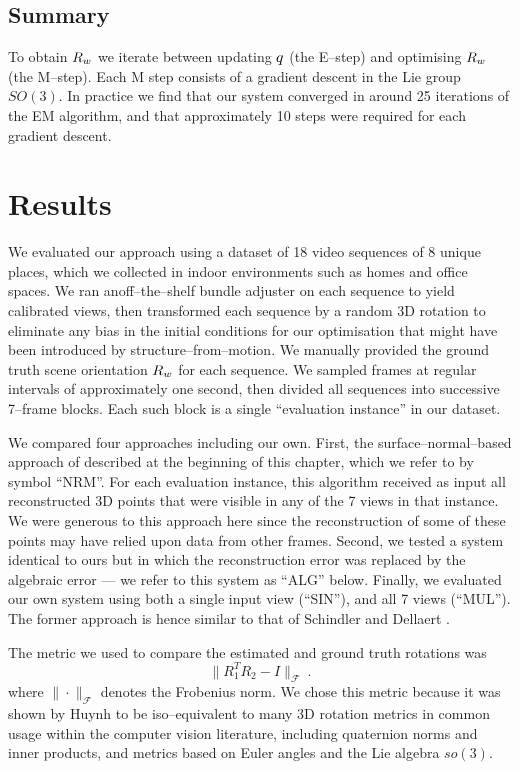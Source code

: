 \subsection{Summary}
To obtain $\SceneR$ we iterate between updating $\PosteriorEst$ (the
E--step) and optimising $\SceneR$ (the M--step). Each M step consists
of a gradient descent in the Lie group $SO(3)$. In practice we find
that our system converged in around 25 iterations of the EM algorithm,
and that approximately 10 steps were required for each gradient
descent.

\section{Results}

We evaluated our approach using a dataset of 18 video sequences of 8
unique places, which we collected in indoor environments such as homes
and office spaces. We ran an\changedsinceviva off--the--shelf bundle
adjuster on each sequence to yield calibrated views, then transformed
each sequence by a random 3D rotation to eliminate any bias in the
initial conditions for our optimisation that might have been
introduced by structure--from--motion. We manually provided the ground
truth scene orientation $\SceneR$ for each sequence. We sampled frames
at regular intervals of approximately one second, then divided all
sequences into successive 7--frame blocks. Each such block is a single
``evaluation instance'' in our dataset.

We compared four approaches including our own. First, the
surface--normal--based approach of \cite{Furukawa09} described at the
beginning of this chapter, which we refer to by symbol ``NRM''. For
each evaluation instance, this algorithm received as input all
reconstructed 3D points that were visible in any of the 7 views in
that instance. We were generous to this approach here since the
reconstruction of some of these points may have relied upon data from
other frames. Second, we tested a system identical
to ours but in which the reconstruction error was replaced by the
algebraic error --- we refer to this system as ``ALG'' below. Finally, we
evaluated our own system using both a single input view (``SIN''), and
all 7 views (``MUL''). The former approach is hence similar to that of
Schindler and Dellaert \cite{Schindler2004}.

The metric we used to compare the estimated and ground truth
rotations was
\begin{equation}
  \| R_1^T R_2 - I \|_{\mathcal{F}} ~.
  \label{eq:rotation-metric}
\end{equation}
where $\|\cdot\|_{\mathcal{F}}$ denotes the Frobenius norm. We chose
this metric because it was shown by Huynh \cite{Huynh2009} to be
iso--equivalent to many 3D rotation metrics in common usage within
the computer vision literature, including quaternion norms and inner
products, and metrics based on Euler angles and the Lie algebra
$so(3)$.

